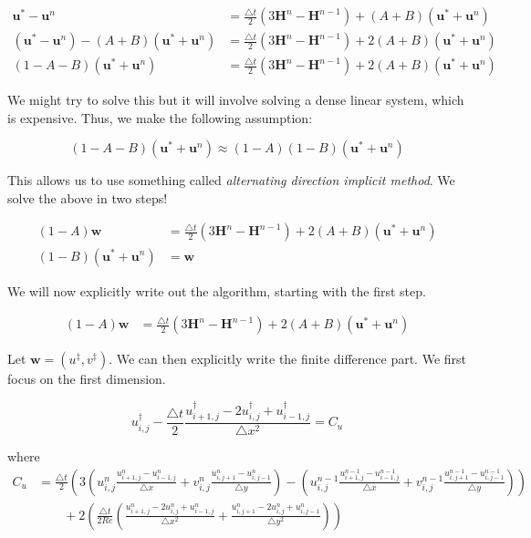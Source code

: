 \documentclass[12pt]{article}
\begin{document}
\begin{align*}
\mathbf{u}^* - \mathbf{u}^n &= \frac{\bigtriangleup t}{2}(3\mathbf{H}^n - \mathbf{H}^{n-1}) + (A + B)(\mathbf{u}^* + \mathbf{u}^n) \\
(\mathbf{u}^* - \mathbf{u}^n) - (A + B)(\mathbf{u}^* + \mathbf{u}^n) &= \frac{\bigtriangleup t}{2}(3\mathbf{H}^n - \mathbf{H}^{n-1}) + 2(A + B)(\mathbf{u}^* + \mathbf{u}^n) \\
(1 - A - B)(\mathbf{u}^* + \mathbf{u}^n) &= \frac{\bigtriangleup t}{2}(3\mathbf{H}^n - \mathbf{H}^{n-1}) + 2(A + B)(\mathbf{u}^* + \mathbf{u}^n)
\end{align*}

We might try to solve this but it will involve solving a dense linear system, which is expensive. Thus, we make the following assumption:

\begin{equation}
(1 - A - B)(\mathbf{u}^* + \mathbf{u}^n) \approx (1 - A)(1 - B)(\mathbf{u}^* + \mathbf{u}^n)
\end{equation}

This allows us to use something called \textit{alternating direction implicit method}. We solve the above in two steps!

\begin{align}
(1 - A)\mathbf{w} &= \frac{\bigtriangleup t}{2}(3\mathbf{H}^n - \mathbf{H}^{n-1}) + 2(A + B)(\mathbf{u}^* + \mathbf{u}^n) \\
(1 - B)(\mathbf{u}^* + \mathbf{u}^n) &= \mathbf{w}
\end{align}

We will now explicitly write out the algorithm, starting with the first step.

\begin{align*}
    (1 - A)\mathbf{w} &= \frac{\bigtriangleup t}{2}(3\mathbf{H}^n - \mathbf{H}^{n-1}) + 2(A + B)(\mathbf{u}^* + \mathbf{u}^n)
\end{align*}

Let $\mathbf{w} = (u^\ddagger, v^\ddagger)$. We can then explicitly write the finite difference part. We first focus on the first dimension.

\begin{equation}
    u^\dagger_{i,j} - \frac{\bigtriangleup t}{2} \frac{u^\dagger_{i+1,j} - 2u^\dagger_{i,j} + u^\dagger_{i-1,j}}{\bigtriangleup x^2} = C_u
\end{equation}

where
\begin{align*}
    C_u &= \frac{\bigtriangleup t}{2}(3(u^n_{i,j}\frac{u^n_{i+1,j} - u^n_{i-1,j}}{\bigtriangleup x} + v^n_{i,j}\frac{u^n_{i,j+1} - u^n_{i,j-1}}{\bigtriangleup y}) - (u^{n-1}_{i,j}\frac{u^{n-1}_{i+1,j} - u^{n-1}_{i-1,j}}{\bigtriangleup x} + v^{n-1}_{i,j}\frac{u^{n-1}_{i,j+1} - u^{n-1}_{i,j-1}}{\bigtriangleup y})) \\
    & \qquad + 2(\frac{\bigtriangleup t}{2 Re}(\frac{u^n_{i+1,j} -2u^n_{i,j} + u^n_{i-1,j}}{\bigtriangleup x^2} + \frac{u^n_{i,j+1} -2u^n_{i,j} + u^n_{i,j-1}}{\bigtriangleup y^2}))
\end{align*}
\end{document}
